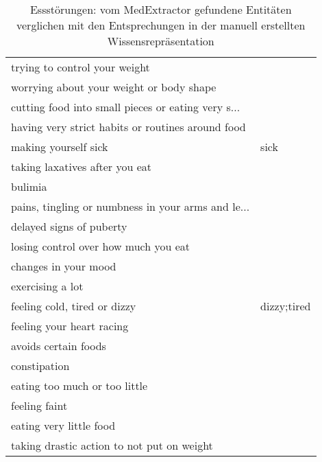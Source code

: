 \begin{table}[H]
\begin{center}
\begin{tabular}{ll}
                     trying to control your weight &               \\
          worrying about your weight or body shape &               \\
cutting food into small pieces or eating very s... &               \\
 having very strict habits or routines around food &               \\
                              making yourself sick &          sick \\
                    taking laxatives after you eat &               \\
                                           bulimia &               \\
pains, tingling or numbness in your arms and le... &               \\
                          delayed signs of puberty &               \\
              losing control over how much you eat &               \\
                              changes in your mood &               \\
                                  exercising a lot &               \\
                      feeling cold, tired or dizzy &   dizzy;tired \\
                         feeling your heart racing &               \\
                              avoids certain foods &               \\
                                      constipation &               \\
                     eating too much or too little &               \\
                                     feeling faint &               \\
                           eating very little food &               \\
        taking drastic action to not put on weight &               \\
\bottomrule
\end{tabular}
\caption{Essstörungen: vom MedExtractor gefundene Entitäten verglichen mit den Entsprechungen in der manuell erstellten Wissensrepräsentation}
\label{tab:eatingdisorders_medextractor_manuell}
\end{center}
\end{table}

